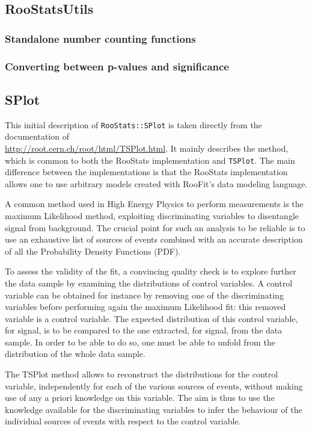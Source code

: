 \documentclass[11pt]{article}
\begin{document}
	\subsection{RooStatsUtils}

		\subsubsection{Standalone number counting functions}

		\subsubsection{Converting between p-values and significance}

	\subsection{SPlot}

This initial description of \texttt{RooStats::SPlot} is taken directly from the documentation of\\ \url{http://root.cern.ch/root/html/TSPlot.html}.  It mainly describes the method, which is common to both the RooStats implementation and \texttt{TSPlot}.  The main difference between the implementations is that the RooStats implementation allows one to use arbitrary models created with RooFit's data modeling language.

A common method used in High Energy Physics to perform measurements is
the maximum Likelihood method, exploiting discriminating variables to
disentangle signal from background. The crucial point for such an
analysis to be reliable is to use an exhaustive list of sources of
events combined with an accurate description of all the Probability
Density Functions (PDF).


To assess the validity of the fit, a convincing quality check
is to explore further the data sample by examining the distributions of
control variables. A control variable can be obtained for instance by
removing one of the discriminating variables before performing again
the maximum Likelihood fit: this removed variable is a control
variable. The expected distribution of this control variable, for
signal, is to be compared to the one extracted, for signal, from the
data sample. In order to be able to do so, one must be able to unfold
from the distribution of the whole data sample.


The TSPlot method allows to reconstruct the distributions for
the control variable, independently for each of the various sources of
events, without making use of any a priori knowledge on this
variable. The aim is thus to use the knowledge available for the
discriminating variables to infer the behaviour of the individual
sources of events with respect to the control variable.
\end{document}
